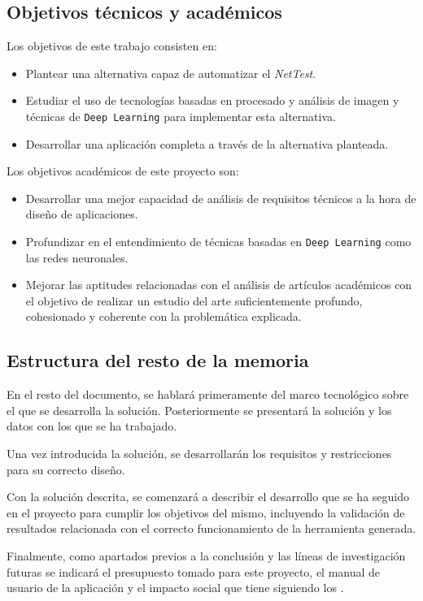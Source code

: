 \subsection{Objetivos técnicos y académicos}
Los objetivos de este trabajo consisten en:

\begin{itemize}
    \item Plantear una alternativa capaz de automatizar el \textit{NetTest}.
    \item Estudiar el uso de tecnologías basadas en procesado y análisis de imagen y técnicas de \texttt{Deep Learning} para implementar esta alternativa.
    \item Desarrollar una aplicación completa a través de la alternativa planteada.
\end{itemize}

Los objetivos académicos de este proyecto son:

\begin{itemize}
    \item Desarrollar una mejor capacidad de análisis de requisitos técnicos a la hora de diseño de aplicaciones.
    \item Profundizar en el entendimiento de técnicas basadas en \texttt{Deep Learning} como las redes neuronales.
    \item Mejorar las aptitudes relacionadas con el análisis de artículos académicos con el objetivo de realizar un estudio del arte suficientemente profundo, cohesionado y coherente con la problemática explicada.
\end{itemize}


\subsection{Estructura del resto de la memoria}

En el resto del documento, se hablará primeramente del marco tecnológico sobre el que se desarrolla la solución. Posteriormente se presentará la solución y los datos con los que se ha trabajado.

Una vez introducida la solución, se desarrollarán los requisitos y restricciones para su correcto diseño.

Con la solución descrita, se comenzará a describir el desarrollo que se ha seguido en el proyecto para cumplir los objetivos del mismo, incluyendo la validación de resultados relacionada con el 
correcto funcionamiento de la herramienta generada.

Finalmente, como apartados previos a la conclusión y las líneas de investigación futuras se indicará el presupuesto tomado para este proyecto, el manual de usuario de la aplicación y el impacto social 
que tiene siguiendo los .
